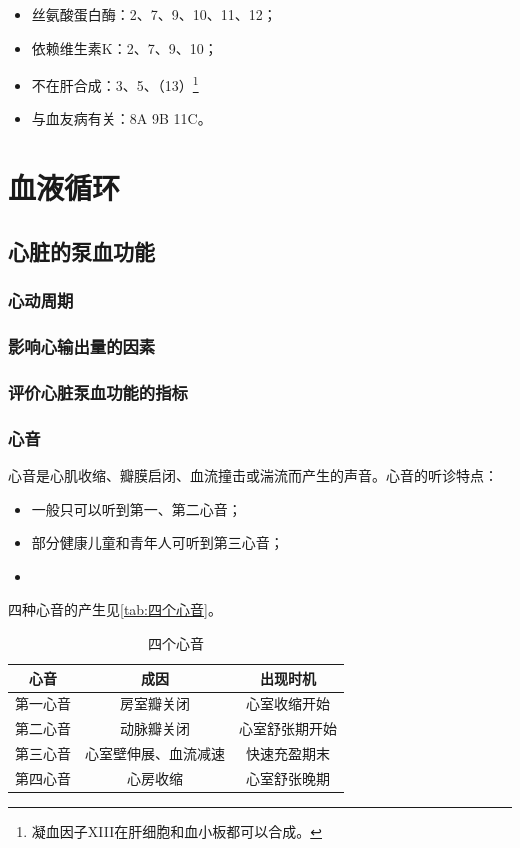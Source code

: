 \begin{itemize}
	\item 丝氨酸蛋白酶：2、7、9、10、11、12；
	\item 依赖维生素K：2、7、9、10；
	\item 不在肝合成：3、5、（13）\footnote{凝血因子XIII在肝细胞和血小板都可以合成。}
	\item 与血友病有关：8A 9B 11C。
\end{itemize}
\section{血液循环}

\subsection{心脏的泵血功能}

\subsubsection{心动周期}

\subsubsection{影响心输出量的因素}

\subsubsection{评价心脏泵血功能的指标}

\subsubsection{心音}

心音是心肌收缩、瓣膜启闭、血流撞击或湍流而产生的声音。心音的听诊特点：

\begin{itemize}
	\item 一般只可以听到第一、第二心音；
	\item 部分健康儿童和青年人可听到第三心音；
	\item {}
\end{itemize}

四种心音的产生见\autoref{tab:四个心音}。

\begin{table}[htbp]
	\centering
	\begin{tabularx}{\textwidth}{|c|C|C|}
		\hline
		心音 & 成因 & 出现时机 \\ \hline
		第一心音 & 房室瓣关闭 & 心室收缩开始 \\ \hline
		第二心音 & 动脉瓣关闭 & 心室舒张期开始 \\ \hline
		第三心音 & 心室壁伸展、血流减速 & 快速充盈期末 \\ \hline
		第四心音 & 心房收缩 & 心室舒张晚期 \\ \hline
	\end{tabularx}
	\caption{四个心音}
	\label{tab:四个心音}
\end{table}

